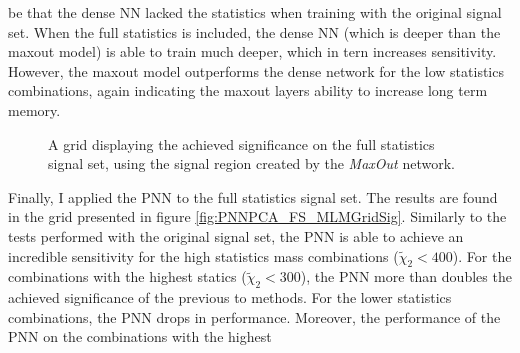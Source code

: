be that the dense \ac{NN} lacked the statistics when training with the original signal set. When the full statistics is included,
the dense \ac{NN} (which is deeper than the maxout model) is able to train much deeper, which in tern increases sensitivity. 
However, the maxout model outperforms the dense network for the low statistics combinations, again indicating the maxout layers
ability to increase long term memory.\\
\begin{figure}
    \caption{A grid displaying the achieved significance on the full statistics signal set, using the signal region 
    created by the \emph{MaxOut} network.}
    \label{fig:MaxOutPCA_FS_MLMGridSig}
\end{figure}
Finally, I applied the \ac{PNN} to the full statistics signal set. The results are found in the grid presented in figure \ref{fig:PNNPCA_FS_MLMGridSig}.
Similarly to the tests performed with the original signal set, the \ac{PNN} is able to achieve an incredible sensitivity for the high statistics mass combinations
($\tilde{\chi}_2<400$). For the combinations with the highest statics ($\tilde{\chi}_2<300$), the \ac{PNN} more than doubles the achieved significance of the previous 
to methods. For the lower statistics combinations, the \ac{PNN} drops in performance. Moreover, the performance of the \ac{PNN} on the combinations with the highest 
